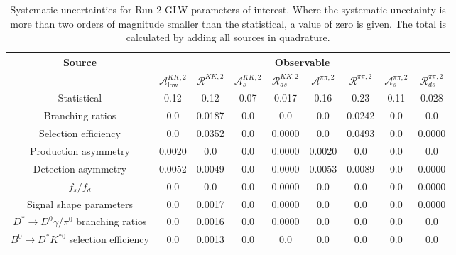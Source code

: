 \begin{sidewaystable}
  \centering
  \begin{tabular}{ccccccccc}
      \toprule
      Source & \multicolumn{8}{c}{Observable} \\
      \midrule
       & $\mathcal{A}_\mathrm{low}^{KK,2}$ & $\mathcal{R}^{KK,2}$ & $\mathcal{A}_s^{KK,2}$ & $\mathcal{R}_{ds}^{KK,2}$ & $\mathcal{A}^{\pi\pi,2}$ & $\mathcal{R}^{\pi\pi,2}$ & $\mathcal{A}_s^{\pi\pi,2}$ & $\mathcal{R}_{ds}^{\pi\pi,2}$ \\
      \midrule
      Statistical & 0.12 & 0.12 & 0.07 & 0.017 & 0.16 & 0.23 & 0.11 & 0.028 \\
      \midrule
      Branching ratios & 0.0  & 0.0187 & 0.0  & 0.0  & 0.0  & 0.0242 & 0.0  & 0.0  \\
      Selection efficiency & 0.0  & 0.0352 & 0.0  & 0.0000 & 0.0  & 0.0493 & 0.0  & 0.0000 \\
      Production asymmetry & 0.0020 & 0.0  & 0.0  & 0.0000 & 0.0020 & 0.0  & 0.0  & 0.0  \\
      Detection asymmetry & 0.0052 & 0.0049 & 0.0  & 0.0000 & 0.0053 & 0.0089 & 0.0  & 0.0000 \\
      $f_s/f_d$ & 0.0  & 0.0  & 0.0  & 0.0000 & 0.0  & 0.0  & 0.0  & 0.0000 \\
      Signal shape parameters & 0.0  & 0.0017 & 0.0  & 0.0000 & 0.0  & 0.0  & 0.0  & 0.0000 \\
      $D^* \to D^0 \gamma/\pi^0$ branching ratios & 0.0  & 0.0016 & 0.0  & 0.0000 & 0.0  & 0.0  & 0.0  & 0.0  \\
      $B^0 \to D^* K^{*0}$ selection efficiency & 0.0  & 0.0013 & 0.0  & 0.0  & 0.0  & 0.0  & 0.0  & 0.0  \\
      \bottomrule
  \end{tabular}
  \caption{Systematic uncertainties for Run 2 GLW parameters of interest. Where the systematic uncetainty is more than two orders of magnitude smaller than the statistical, a value of zero is given. The total is calculated by adding all sources in quadrature.}
\label{tab:KK_run2_systematics}
\end{sidewaystable}
